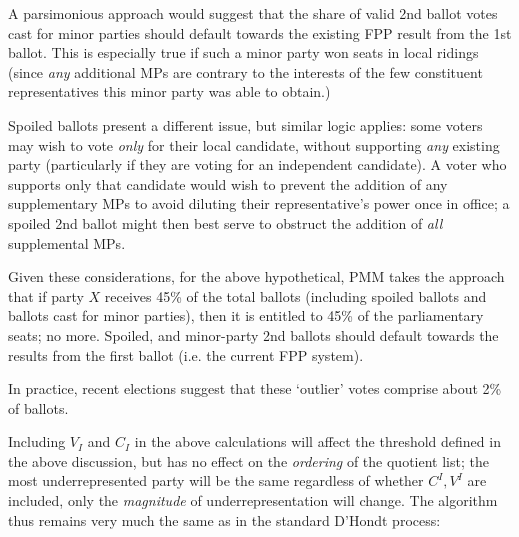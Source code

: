 \documentclass[DIV=calc, paper=a4, fontsize=11pt, twocolumn]{scrartcl}	 %
\begin{document}
A parsimonious approach would suggest that the share of valid 2nd ballot votes cast for minor parties should default towards the existing FPP result from the 1st ballot. This is especially true if such a minor party won seats in local ridings (since \emph{any} additional MPs are contrary to the interests of the few constituent representatives this minor party was able to obtain.) 

Spoiled ballots present a different issue, but similar logic applies: some voters may wish to vote \emph{only} for their local candidate, without supporting \emph{any} existing party (particularly if they are voting for an independent candidate). A voter who supports only that candidate would wish to prevent the addition of any supplementary MPs to avoid diluting their representative's power once in office; a spoiled 2nd ballot might then best serve to obstruct the addition of \emph{all} supplemental MPs.

Given these considerations, for the above hypothetical, PMM takes the approach that if party $X$ receives 45\% of the total ballots (including spoiled ballots and ballots cast for minor parties), then it is entitled to 45\% of the parliamentary seats; no more. 
Spoiled, and minor-party 2nd ballots should default towards the results from the first ballot (i.e. the current FPP system).

In practice, recent elections suggest that these `outlier' votes comprise about 2\% of ballots. 

Including $V_I$ and $C_I$ in the above calculations will affect the threshold defined in the above discussion, but has no effect on the \emph{ordering} of the quotient list; the most underrepresented party will be the same regardless of whether $C^I, V^I$ are included, only the \emph{magnitude} of underrepresentation will change. 
The algorithm thus remains very much the same as in the standard D'Hondt process:
\end{document}
